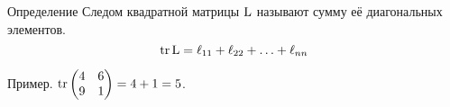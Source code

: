 










    




\begin{frame}
    \begin{block}{Определение}
        \alert{Следом квадратной матрицы} $\operatorname{L}$ называют сумму её диагональных элементов. 
        \[
            \trace \LL = \ell_{11} + \ell_{22} + \ldots + \ell_{nn}
        \]
    \end{block}

    \pause
    Пример. $\trace \begin{pmatrix}
        4 & 6 \\
        9 & 1
    \end{pmatrix} = 4 + 1 = 5$.

\end{frame}





